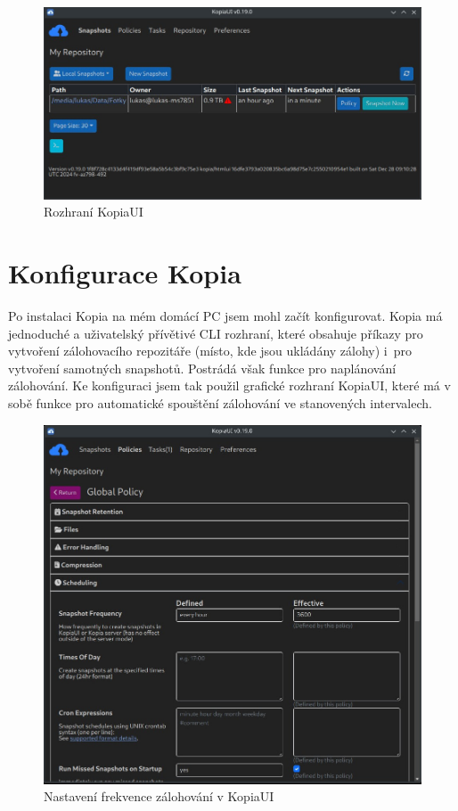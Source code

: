 \documentclass[a4paper,12pt, oneside]{book}
\begin{document}
\begin{figure}[h]
\centering
\includegraphics[width=1\textwidth]{img/kopiaUI-Snapshots.jpg}
\caption{Rozhraní KopiaUI}
\end{figure}


\section{Konfigurace Kopia}

Po instalaci Kopia na mém domácí PC jsem mohl začít
konfigurovat. Kopia má jednoduché a uživatelský přívětivé CLI rozhraní, které
obsahuje příkazy pro vytvoření zálohovacího repozitáře (místo, kde jsou ukládány
zálohy) i pro vytvoření samotných snapshotů. Postrádá však funkce pro
naplánování zálohování. Ke konfiguraci jsem tak použil grafické rozhraní
KopiaUI, které má v sobě funkce pro automatické spouštění zálohování ve
stanovených intervalech. 

\begin{figure}[h]
\centering
\includegraphics[width=1\textwidth]{img/kopiaUI-Policy.jpg}
\caption{Nastavení frekvence zálohování v KopiaUI}
\end{figure}
\end{document}
